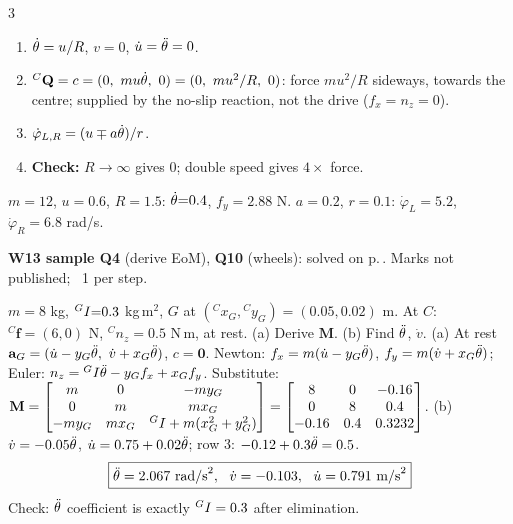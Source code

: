 \begin{multicols}{3}
\nopagebreak[4]
\begin{recipe}
\begin{enumerate}
\item $\dot\theta=u/R$, $v=0$, $\dot u=\ddot\theta=0$.
\item $\wEQC=c=(0,\ mu\wEth,\ 0)=(0,\ mu^2/R,\ 0)$: force $mu^2/R$ sideways, towards the centre; supplied by the no-slip reaction, not the drive ($f_x=n_z=0$).
\item $\dot\varphi_{L,R}=(u\mp a\dot\theta)/r$.
\item \textbf{Check:} $R\to\infty$ gives $0$; double speed gives $4\times$ force.
\end{enumerate}
\end{recipe}
\begin{worked}[ours]
$m{=}12$, $u{=}0.6$, $R{=}1.5$: $\dot\theta{=}0.4$, $f_y{=}\mathbf{2.88}$ N. $a{=}0.2$, $r{=}0.1$: $\dot\varphi_L{=}\mathbf{5.2}$, $\dot\varphi_R{=}\mathbf{6.8}$ rad/s. \chk
\end{worked}

\vbox{
\textbf{W13 sample Q4} (derive EoM), \textbf{Q10} (wheels): solved on p.\,\pageref{p:SAMPLE}. Marks not published; ~1 per step.}
\begin{examq}
$m{=}8$ kg, ${}^{G}I{=}0.3$ kg\,m$^2$, $G$ at $({}^Cx_G,{}^Cy_G){=}(0.05,0.02)$ m. At $C$: ${}^C\mathbf f{=}(6,0)$ N, ${}^Cn_z{=}0.5$ N\,m, at rest. (a) Derive $\mathbf M$. (b) Find $\ddot\theta$, $\dot v$.
\solution
(a) At rest $\mathbf a_G=(\dot u-y_G\wEthh,\ \dot v+x_G\wEthh)$, $c=\mathbf 0$. Newton: $f_x=m(\dot u-y_G\ddot\theta)$, $f_y=m(\dot v+x_G\ddot\theta)$; Euler: $n_z={}^{G}I\ddot\theta-y_Gf_x+x_Gf_y$. Substitute:
$\mathbf M=\begin{bmatrix}m&0&-my_G\\0&m&mx_G\\-my_G&mx_G&{}^{G}I+m(x_G^2+y_G^2)\end{bmatrix}=\begin{bmatrix}8&0&-0.16\\0&8&0.4\\-0.16&0.4&0.3232\end{bmatrix}$.
(b) $\dot v=-0.05\ddot\theta$, $\dot u=0.75+0.02\ddot\theta$; row 3: $-0.12+0.3\ddot\theta=0.5$.
\[\boxed{\ddot\theta=2.067\ \text{rad/s}^2,\ \ \dot v=-0.103,\ \ \dot u=0.791\ \text{m/s}^2}\]
Check: $\ddot\theta$ coefficient is exactly ${}^{G}I=0.3$ after elimination. \chk
\end{examq}
\end{multicols}
